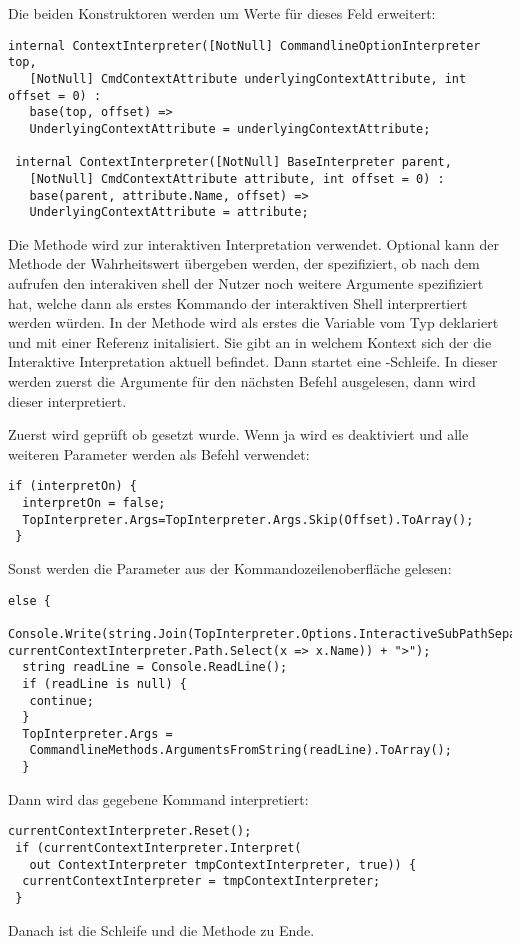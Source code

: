 Die beiden Konstruktoren werden um Werte für dieses Feld erweitert:
\begin{lstlisting}[language={[Sharp]C}, title=Konstruktoren der ContextInterpreter Klasse]
 internal ContextInterpreter([NotNull] CommandlineOptionInterpreter top,
   [NotNull] CmdContextAttribute underlyingContextAttribute, int offset = 0) :
   base(top, offset) =>
   UnderlyingContextAttribute = underlyingContextAttribute;

 internal ContextInterpreter([NotNull] BaseInterpreter parent,
   [NotNull] CmdContextAttribute attribute, int offset = 0) :
   base(parent, attribute.Name, offset) =>
   UnderlyingContextAttribute = attribute;
\end{lstlisting}
Die  Methode wird zur interaktiven Interpretation verwendet.
Optional kann der Methode der Wahrheitswert  übergeben werden, der spezifiziert,
ob nach dem aufrufen den interakiven shell der Nutzer noch weitere Argumente spezifiziert hat, welche dann als erstes Kommando der interaktiven Shell interprertiert werden würden.
In der Methode wird als erstes die  Variable vom Typ  deklariert und mit einer  Referenz initalisiert.
Sie gibt an in welchem Kontext sich der die Interaktive Interpretation aktuell befindet.
Dann startet eine -Schleife.
In dieser werden zuerst die Argumente für den nächsten Befehl ausgelesen, dann wird dieser interpretiert.

Zuerst wird geprüft ob  gesetzt wurde.
Wenn ja wird es deaktiviert und alle weiteren Parameter werden als Befehl verwendet:
\begin{lstlisting}[title=""]
 if (interpretOn) {
  interpretOn = false;
  TopInterpreter.Args=TopInterpreter.Args.Skip(Offset).ToArray();
 }
\end{lstlisting}
Sonst werden die Parameter aus der Kommandozeilenoberfläche gelesen:
\begin{lstlisting}[title=""]
 else {
  Console.Write(string.Join(TopInterpreter.Options.InteractiveSubPathSeparator, currentContextInterpreter.Path.Select(x => x.Name)) + ">");
  string readLine = Console.ReadLine();
  if (readLine is null) {
   continue;
  }
  TopInterpreter.Args =
   CommandlineMethods.ArgumentsFromString(readLine).ToArray();
  } \end{lstlisting}
Dann wird das gegebene Kommand interpretiert:
\begin{lstlisting}[title=""]
 currentContextInterpreter.Reset();
 if (currentContextInterpreter.Interpret(
   out ContextInterpreter tmpContextInterpreter, true)) {
  currentContextInterpreter = tmpContextInterpreter;
 }
\end{lstlisting}
Danach ist die Schleife und die Methode zu Ende.

